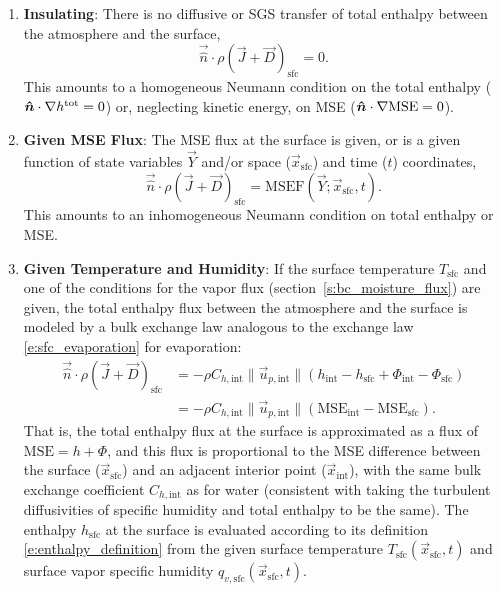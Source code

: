 \documentclass{report}
\begin{document}
\begin{enumerate}
    \item \textbf{Insulating}: There is no diffusive or SGS transfer of total enthalpy between the atmosphere and the surface,
    \[
    \vec{\hat n} \cdot \rho (\vec{J} + \vec{D})_\mathrm{sfc} = 0.
    \]
    This amounts to a homogeneous Neumann condition on the total enthalpy ($\boldsymbol{{\hat n}} \cdot \nabla h^\mathrm{tot}=0$) or, neglecting kinetic energy, on MSE ($\boldsymbol{{\hat n}} \cdot \nabla \mathrm{MSE} =0$).
    \item \textbf{Given MSE Flux}: The MSE flux at the surface is given, or is a given function of state variables $\vec{Y}$ and/or space ($\vec{x}_\mathrm{sfc}$) and time ($t$) coordinates,
    \[
    \vec{\hat n} \cdot \rho (\vec{J} + \vec{D})_\mathrm{sfc} = \mathrm{MSEF}(\vec{Y}; \vec{x}_\mathrm{sfc}, t).
    \]
    This amounts to an inhomogeneous Neumann condition on total enthalpy or MSE.
    \item \textbf{Given Temperature and Humidity}: If the surface temperature $T_\mathrm{sfc}$ and one of the conditions for the vapor flux (section~\ref{s:bc_moisture_flux}) are given, the total enthalpy flux between the atmosphere and the surface is modeled by a bulk exchange law analogous to the exchange law \eqref{e:sfc_evaporation} for evaporation:
    \begin{equation}\label{e:sfc_energy_flux}
     \begin{split}
    \vec{\hat n} \cdot \rho (\vec{J} + \vec{D})_\mathrm{sfc} &= -\rho C_{h, \mathrm{int}} \| \vec{u}_{p,\mathrm{int}} \| 
     \left( h_\mathrm{int} -h_\mathrm{sfc} + \Phi_\mathrm{int} -  \Phi_\mathrm{sfc} \right) \\
     &= -\rho C_{h, \mathrm{int}} \| \vec{u}_{p,\mathrm{int}} \|  
      \left( \mathrm{MSE}_\mathrm{int} - \mathrm{MSE}_\mathrm{sfc} \right).
     \end{split}
    \end{equation}
    That is, the total enthalpy flux at the surface is approximated as a flux of $\mathrm{MSE} =h + \Phi$, and this flux is proportional to the MSE difference between the surface ($\vec{x}_\mathrm{sfc}$) and an adjacent interior point ($\vec{x}_\mathrm{int}$), with the same bulk exchange coefficient $C_{h, \mathrm{int}}$ as for water (consistent with taking the turbulent diffusivities of specific humidity and total enthalpy to be the same). The enthalpy $h_\mathrm{sfc}$ at the surface is evaluated according to its definition \eqref{e:enthalpy_definition} from the given surface temperature $T_\mathrm{sfc}(\vec{x}_\mathrm{sfc}, t)$ and surface vapor specific humidity $q_{v, \mathrm{sfc}}(\vec{x}_\mathrm{sfc}, t)$. 
    

\end{enumerate}
\end{document}
